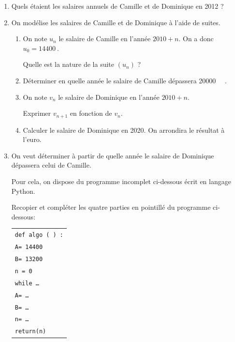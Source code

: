 \documentclass[10pt]{article}
\providecommand{\euro}{\texteuro}
\providecommand{\np}[2][]{{#2~#1}}
\providecommand{\euro}{{\text{€}}}
\renewcommand{\euro}{\ifmmode\text{\texteuro}\else\texteuro\fi}
\begin{document}
\begin{enumerate}
\item Quels étaient les salaires annuels de Camille et de Dominique en 2012 ? 
\item  On modélise les salaires de Camille et de Dominique à l'aide de suites.
	\begin{enumerate}
		\item On note $u_n$ le salaire de Camille en l'année $2010 +n$. On a donc $u_0 = \np{14400}$.
		
Quelle est la nature de la suite $\left(u_n\right)$ ?
		\item Déterminer en quelle année le salaire de Camille dépassera \np{20000}~ \euro.
		\item On note $v_n$ le salaire de Dominique en l'année $2010 +n$.
		
Exprimer $v_{n+1}$ en fonction de $v_n$.
		\item Calculer le salaire de Dominique en 2020. On arrondira le résultat à l'euro.
	\end{enumerate}
\item On veut déterminer à partir de quelle année le salaire de Dominique dépassera celui de Camille. 

Pour cela, on dispose du programme incomplet ci-dessous écrit en langage Python.

Recopier et compléter les quatre parties en pointillé du programme ci-dessous:

\begin{center}
\begin{tabular}{|l|}\hline
\texttt{def algo ( ) :}\\
\qquad \texttt{A= \np{14400}}\\
\qquad \texttt{B= \np{13200}}\\
\qquad \texttt{n = 0}\\
\qquad \texttt{while \ldots}\\
\qquad \qquad \texttt{A= \ldots}\\
\qquad \qquad \texttt{B= \ldots}\\
\qquad \qquad \texttt{n= \ldots}\\
\qquad \texttt{return(n)}\\ \hline
\end{tabular}
\end{center}
\end{enumerate}

\bigskip
\end{document}
